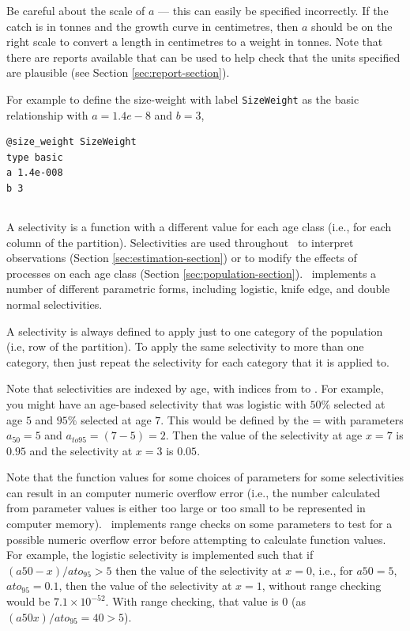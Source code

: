 Be careful about the scale of $a$ --- this can easily be specified incorrectly. If the catch is in tonnes and the growth curve in centimetres, then $a$ should be on the right scale to convert a length in centimetres to a weight in tonnes. Note that there are reports available that can be used to help check that the units specified are plausible (see Section \ref{sec:report-section}).

For example to define the size-weight with label \texttt{SizeWeight} as the basic relationship with $a=1.4e-8$ and $b=3$,

{\small{\begin{verbatim}
@size_weight SizeWeight
type basic
a 1.4e-008
b 3
\end{verbatim}}}

\subsection{\label{sec:selectivities}}

A selectivity is a function with a different value for each age class (i.e., for each column of the partition). Selectivities are used throughout \SPM\ to interpret observations (Section \ref{sec:estimation-section}) or to modify the effects of processes on each age class (Section \ref{sec:population-section}). \SPM\ implements a number of different parametric forms, including logistic, knife edge, and double normal selectivities.

A selectivity is always defined to apply just to one category of the population (i.e, row of the partition). To apply the same selectivity to more than one category, then just repeat the selectivity for each category that it is applied to.

Note that selectivities are indexed by age, with indices from  to . For example, you might have an age-based selectivity that was logistic with $50\%$ selected at age $5$ and $95\%$ selected at age $7$. This would be defined by the = with parameters $a_{50}=5$ and $a_{to95}=(7-5)=2$. Then the value of the selectivity at age $x=7$ is $0.95$ and the selectivity at $x=3$ is $0.05$.

Note that the function values for some choices of parameters for some selectivities can result in an computer numeric overflow error (i.e., the number calculated from parameter values is either too large or too small to be represented in computer memory). \SPM\ implements range checks on some parameters to test for a possible numeric overflow error before attempting to calculate function values. For example, the logistic selectivity is implemented such that if $(a50-x)/ato_95 > 5$ then the value of the selectivity at $x=0$, i.e., for $a50=5$, $ato_95=0.1$, then the value of the selectivity at $x=1$, without range checking would be $7.1 \times 10^{-52}$. With range checking, that value is $0$ (as $(a50 x)/ato_95=40 > 5$).

